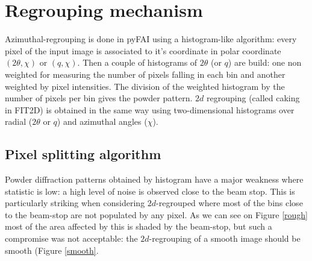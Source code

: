 \documentclass[a4paper]{jpconf}
\begin{document}
\section{Regrouping mechanism}
Azimuthal-regrouping is done in pyFAI using a histogram-like algorithm: every
pixel of the input image is associated to it's coordinate in polar coordinate
$(2\theta , \chi )$ or $(q, \chi )$. Then a couple of histograms of $2\theta$
(or $q$) are build:
one non weighted for measuring the number of pixels falling in each bin and
another weighted by pixel intensities.
The division of the weighted histogram by the number of  pixels per bin gives
the powder pattern.
$2d$ regrouping (called caking in FIT2D) is obtained in the same way using
two-dimensional histograms over radial ($2\theta$ or $q$) and azimuthal angles
($\chi$).

\subsection{Pixel splitting algorithm}
Powder diffraction patterns obtained by histogram have a major weakness where
statistic is low: a high level of  noise is observed close to the beam
stop.
This is particularly striking when considering  $2d$-regrouped where most of
the bins close to the beam-stop are not populated by any pixel. As we can
see on Figure \ref{rough} most of the area affected by this is shaded by the beam-stop, but such a compromise was not acceptable:
the  $2d$-regrouping of a smooth image should be smooth (Figure \ref{smooth}.
\end{document}
